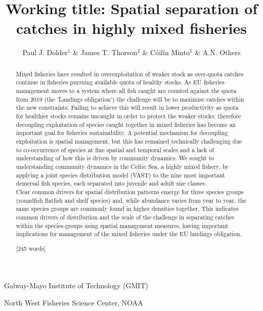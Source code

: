 \documentclass{nature}
\title{Working title: Spatial separation of catches in highly mixed fisheries}
\author{Paul J. Dolder$^1$ \& James T. Thorson$^2$ \& Cóilín Minto$^1$ \& A.N.
Others}
\begin{document}
\maketitle

\begin{affiliations}
\item Galway-Mayo Institute of Technology (GMIT) 
\item North West Fisheries Science Center, NOAA
\end{affiliations}

\begin{linenumbers}

\begin{abstract} 
Mixed fisheries have resulted in overexploitation of weaker stock as over-quota
catches continue in fisheries pursuing available quota of healthy stocks. As EU
fisheries management moves to a system where all fish caught are counted
against the quota from 2019 (the 'Landings obligation') the challenge will be
to maximise catches within the new constraints. Failing to achieve this will
result in lower productivity as quota for healthier stocks remains uncaught in
order to protect the weaker stocks; therefore decoupling exploitation of
species caught together in mixed fisheries has become an important goal for
fisheries sustainability.  A potential mechanism for decoupling exploitation is
spatial management, but this has remained technically challenging due to
co-occurrence of species at fine spatial and temporal scales and a lack of
understanding of how this is driven by community dynamics.  We sought to
understanding community dynamics in the Celtic Sea, a highly mixed fishery, by
applying a joint species distribution model (VAST) to the nine most important
demersal fish species, each separated into juvenile and adult size classes.  \\

Clear common drivers for spatial distribution patterns emerge for three species
groups (roundfish flatfish and shelf species) and, while abundance varies from
year to year, the same species groups are commonly found in higher densities
together. This indicates common drivers of distribution and the scale of the
challenge in separating catches within the species-groups using spatial
management measures, having important implications for management of the mixed
fisheries under the EU landings obligation.

[245 words]

\end{abstract}


\end{linenumbers}
\end{document}
